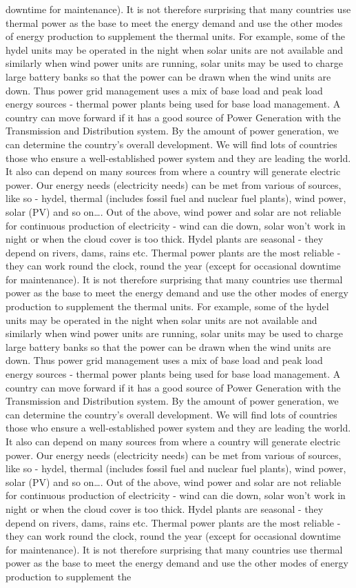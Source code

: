 \documentclass[10pt, a4paper]{article}
\begin{document}
downtime for maintenance). It is not therefore surprising that many countries use thermal power as the base to meet the energy demand and use the other modes of energy production to supplement the thermal units. For example, some of the hydel units may be operated in the night when solar units are not available and similarly when wind power units are running, solar units may be used to charge large battery banks so that the power can be drawn when the wind units are down. Thus power grid management uses a mix of base load and peak load energy sources - thermal power plants being used for base load management. A country can move forward if it has a good source of Power Generation with the Transmission and Distribution system. By the amount of power generation, we can determine the country’s overall development. We will find lots of countries those who ensure a well-established power system and they are leading the world. It also can depend on many sources from where a country will generate electric power. Our energy needs (electricity needs) can be met from various of sources, like so - hydel, thermal (includes fossil fuel and nuclear fuel plants), wind power, solar (PV) and so on\dots. Out of the above, wind power and solar are not reliable for continuous production of electricity - wind can die down, solar won’t work in night or when the cloud cover is too thick. Hydel plants are seasonal - they depend on rivers, dams, rains etc. Thermal power plants are the most reliable - they can work round the clock, round the year (except for occasional downtime for maintenance). It is not therefore surprising that many countries use thermal power as the base to meet the energy demand and use the other modes of energy production to supplement the thermal units. For example, some of the hydel units may be operated in the night when solar units are not available and similarly when wind power units are running, solar units may be used to charge large battery banks so that the power can be drawn when the wind units are down. Thus power grid management uses a mix of base load and peak load energy sources - thermal power plants being used for base load management. A country can move forward if it has a good source of Power Generation with the Transmission and Distribution system. By the amount of power generation, we can determine the country’s overall development. We will find lots of countries those who ensure a well-established power system and they are leading the world. It also can depend on many sources from where a country will generate electric power. Our energy needs (electricity needs) can be met from various of sources, like so - hydel, thermal (includes fossil fuel and nuclear fuel plants), wind power, solar (PV) and so on\dots. Out of the above, wind power and solar are not reliable for continuous production of electricity - wind can die down, solar won’t work in night or when the cloud cover is too thick. Hydel plants are seasonal - they depend on rivers, dams, rains etc. Thermal power plants are the most reliable - they can work round the clock, round the year (except for occasional downtime for maintenance). It is not therefore surprising that many countries use thermal power as the base to meet the energy demand and use the other modes of energy production to supplement the 
\end{document}
